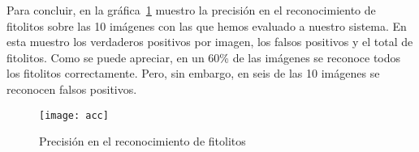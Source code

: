 Para concluir, en la gráfica~\ref{fig:acc} muestro la precisión en el reconocimiento de fitolitos sobre las 10 imágenes con las que hemos evaluado a nuestro sistema. En esta muestro los verdaderos positivos por imagen, los falsos positivos y el total de fitolitos. Como se puede apreciar, en un 60\% de las imágenes se reconoce todos los fitolitos correctamente. Pero, sin embargo, en seis de las 10 imágenes se reconocen falsos positivos.

\begin{figure}
\centering
\texttt{[image: acc]}
\caption{Precisión en el reconocimiento de fitolitos}
\label{fig:acc}
\end{figure}